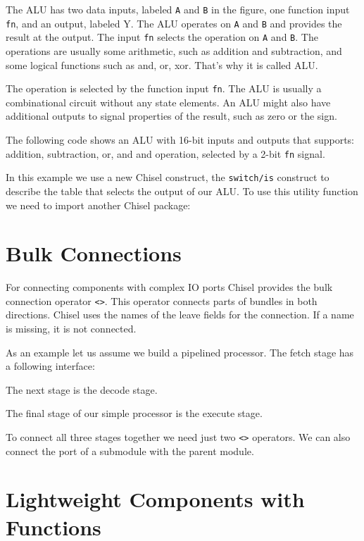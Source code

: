\documentclass[%
    10pt,
    headinclude, footexclude,
    openright, %
    notitlepage,
    cleardoubleempty,
    headsepline,
    pointlessnumbers,
    bibtotoc, idxtotoc,
    ]{scrbook}
\newcommand{\code}[1]{{\small{\texttt{#1}}}}
\begin{document}
The ALU has two data inputs, labeled \code{A} and \code{B} in the figure, one function input \code{fn},
and an output, labeled {Y}. The ALU operates on \code{A} and \code{B} and provides the result
at the output. The input \code{fn} selects the operation on \code{A} and \code{B}.
The operations are usually some arithmetic, such as addition and subtraction, and some logical
functions such as and, or, xor. That's why it is called ALU.

The operation is selected by the function input \code{fn}. The ALU is usually a combinational
circuit without any state elements. An ALU might also have additional outputs to signal properties
of the result, such as zero or the sign.

The following code shows an ALU with 16-bit inputs and outputs that supports: addition, subtraction, or, and and
operation, selected by a 2-bit \code{fn} signal.


\noindent In this example we use a new Chisel construct, the \code{switch/is} construct to describe
the table that selects the output of our ALU.
To use this utility function we need to import another Chisel package:


\section{Bulk Connections}

For connecting components with complex IO ports Chisel provides the
bulk connection operator \code{<>}. This operator connects parts of bundles
in both directions. Chisel uses the names of the leave fields for the connection.
If a name is missing, it is not connected.

As an example let us assume we build a pipelined processor. The fetch
stage has a following interface:

\noindent The next stage is the decode stage.

\noindent The final stage of our simple processor is the execute stage.

To connect all three stages together we need just two \code{<>} operators.
We can also connect the port of a submodule with the parent module.


\section{Lightweight Components with Functions}
\end{document}

